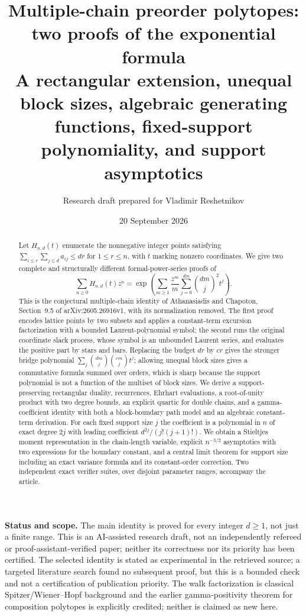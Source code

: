 \documentclass[11pt]{article}
\title{\textbf{Multiple-chain preorder polytopes:\\
two proofs of the exponential formula}\\[0.6em]
\large A rectangular extension, unequal block sizes, algebraic generating
functions, fixed-support polynomiality, and support asymptotics}
\author{Research draft prepared for Vladimir Reshetnikov}
\date{20 September 2026}
\numberwithin{equation}{section}
\theoremstyle{definition}
\begin{document}
\maketitle
\thispagestyle{empty}

\begin{abstract}
Let $H_{n,d}(t)$ enumerate the nonnegative integer points satisfying
$\sum_{i\leq r}\sum_{j\leq d}a_{ij}\leq dr$ for $1\leq r\leq n$, with
$t$ marking nonzero coordinates. We give two complete and structurally
different formal-power-series proofs of
\[
 \sum_{n\geq0}H_{n,d}(t)z^n
 =\exp\left(\sum_{m\geq1}\frac{z^m}{m}
       \sum_{j=0}^{dm}\binom{dm}{j}^{\!2}t^j\right).
\]
This is the conjectural multiple-chain identity of Athanasiadis and Chapoton,
Section~9.5 of arXiv:2605.26916v1, with its normalization removed. The first
proof encodes lattice points by two subsets and applies a constant-term
excursion factorization with a bounded Laurent-polynomial symbol; the second
runs the original coordinate slack process, whose symbol is an unbounded
Laurent series, and evaluates the positive part by stars and bars. Replacing
the budget $dr$ by $cr$ gives the stronger bridge polynomial
$\sum_j\binom{dm}{j}\binom{cm}{j}t^j$; allowing unequal block sizes gives a
commutative formula summed over orders, which is sharp because the support
polynomial is not a function of the multiset of block sizes. We derive a
support-preserving rectangular duality, recurrences, Ehrhart evaluations, a
root-of-unity product with two degree bounds, an explicit quartic for double
chains, and a gamma-coefficient identity with both a block-boundary path
model and an algebraic constant-term derivation. For each fixed support size
$j$ the coefficient is a polynomial in $n$ of exact degree $2j$ with leading
coefficient $d^{2j}/(j!(j+1)!)$. We obtain a Stieltjes moment representation
in the chain-length variable, explicit $n^{-3/2}$ asymptotics with two
expressions for the boundary constant, and a central limit theorem for
support size including an exact variance formula and its constant-order
correction. Two independent exact verifier suites, over disjoint parameter
ranges, accompany the article.
\end{abstract}

\medskip
\noindent\textbf{Status and scope.}
The main identity is proved for every integer $d\geq1$, not just a finite
range. This is an AI-assisted research draft, not an independently refereed or
proof-assistant-verified paper; neither its correctness nor its priority has
been certified. The selected identity is stated as experimental in the
retrieved source; a targeted literature search found no subsequent proof, but
this is a bounded check and not a certification of publication priority. The
walk factorization is classical Spitzer/Wiener--Hopf background and the
earlier gamma-positivity theorem for composition polytopes is explicitly
credited; neither is claimed as new here.
\end{document}
